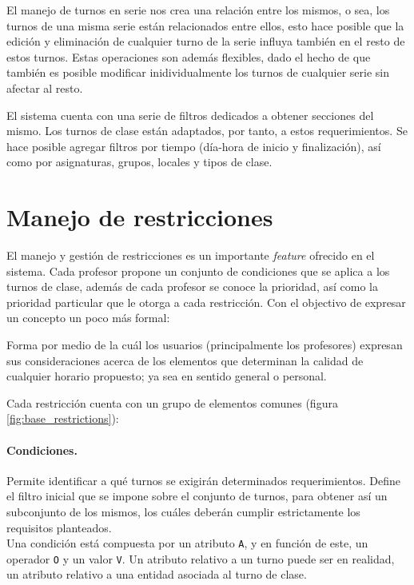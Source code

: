 El manejo de turnos en serie nos crea una relación entre los mismos, o sea, los turnos de una misma serie están relacionados entre ellos, esto hace posible que la edición y eliminación de cualquier turno de la serie influya también en el resto de estos turnos. Estas operaciones son además flexibles, dado el hecho de que también es posible modificar inidividualmente los turnos de cualquier serie sin afectar al resto.

El sistema cuenta con una serie de filtros dedicados a obtener secciones del mismo. Los turnos de clase están adaptados, por tanto, a estos requerimientos. Se hace posible agregar filtros por tiempo (día-hora de inicio y finalización), así como por asignaturas, grupos, locales y tipos de clase. 

\section{Manejo de restricciones}

El manejo y gestión de restricciones es un importante \textit{feature} ofrecido en el sistema. Cada profesor propone un conjunto de condiciones que se aplica a los turnos de clase, además de cada profesor se conoce la prioridad, así como la prioridad particular que le otorga a cada restricción. 
Con el objectivo de expresar un concepto un poco más formal: 
\begin{dfn}[Restricción]
	Forma por medio de la cuál los usuarios (principalmente los profesores) expresan sus consideraciones acerca de los elementos que determinan la calidad de cualquier horario propuesto; ya sea en sentido general o personal.
\end{dfn} 

Cada restricción cuenta con un grupo de elementos comunes (figura \ref{fig:base_restrictions}):\\

\paragraph{Condiciones.}
Permite identificar a qué turnos se exigirán determinados requerimientos. Define el filtro inicial que se impone sobre el conjunto de turnos, para obtener así un subconjunto de los mismos, los cuáles deberán cumplir estrictamente los requisitos planteados.\\
	
Una condición está compuesta por un atributo \texttt{A}, y en función de este, un operador \texttt{O} y un valor \texttt{V}. Un atributo relativo a un turno puede ser en realidad, un atributo relativo a una entidad asociada al turno de clase.\\

